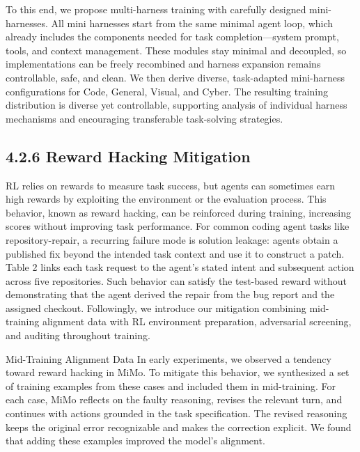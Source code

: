 \documentclass[
  10
]{article}
\begin{document}
To this end, we propose multi-harness training with carefully designed
mini-harnesses. All mini harnesses start from the same minimal agent
loop, which already includes the components needed for task
completion---system prompt, tools, and context management. These modules
stay minimal and decoupled, so implementations can be freely recombined
and harness expansion remains controllable, safe, and clean. We then
derive diverse, task-adapted mini-harness configurations for Code,
General, Visual, and Cyber. The resulting training distribution is
diverse yet controllable, supporting analysis of individual harness
mechanisms and encouraging transferable task-solving strategies.

\subsection{4.2.6 Reward Hacking
Mitigation}\label{reward-hacking-mitigation}

RL relies on rewards to measure task success, but agents can sometimes
earn high rewards by exploiting the environment or the evaluation
process. This behavior, known as reward hacking, can be reinforced
during training, increasing scores without improving task performance.
For common coding agent tasks like repository-repair, a recurring
failure mode is solution leakage: agents obtain a published fix beyond
the intended task context and use it to construct a patch. Table 2 links
each task request to the agent's stated intent and subsequent action
across five repositories. Such behavior can satisfy the test-based
reward without demonstrating that the agent derived the repair from the
bug report and the assigned checkout. Followingly, we introduce our
mitigation combining mid-training alignment data with RL environment
preparation, adversarial screening, and auditing throughout training.

Mid-Training Alignment Data In early experiments, we observed a tendency
toward reward hacking in MiMo. To mitigate this behavior, we synthesized
a set of training examples from these cases and included them in
mid-training. For each case, MiMo reflects on the faulty reasoning,
revises the relevant turn, and continues with actions grounded in the
task specification. The revised reasoning keeps the original error
recognizable and makes the correction explicit. We found that adding
these examples improved the model's alignment.
\end{document}
